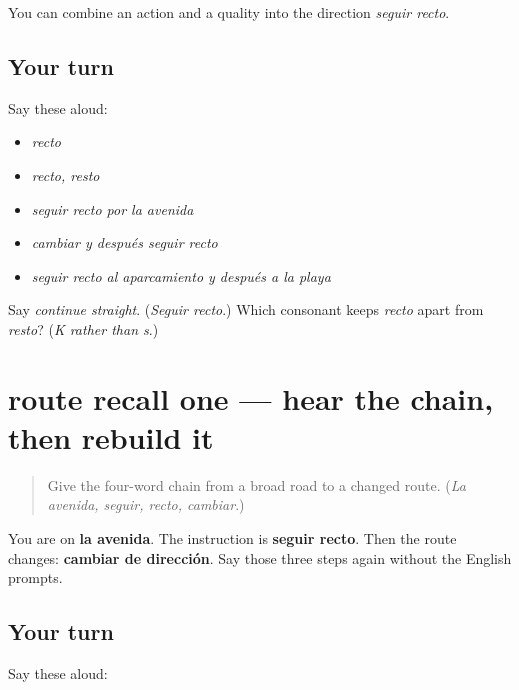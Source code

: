 \begin{grammarlens}[title={What you've built}]
You can combine an action and a quality into the direction \emph{seguir recto}.
\end{grammarlens}

\subsection*{Your turn}
Say these aloud:

\begin{itemize}
\raggedright
  \item \emph{recto}
  \item \emph{recto, resto}
  \item \emph{seguir recto por la avenida}
  \item \emph{cambiar y después seguir recto}
  \item \emph{seguir recto al aparcamiento y después a la playa}
\end{itemize}

\begin{tcolorbox}[breakable,colback=teal!4,colframe=teal!35!black,title={Before you move on}]
Say \emph{continue straight}. (\emph{Seguir recto}.) Which consonant keeps \emph{recto} apart from \emph{resto}? (\emph{K rather than s}.)
\end{tcolorbox}
\section[(review)]{route recall one — hear the chain, then rebuild it}

\label{lesson:ES-C401-route-recall-1}



\begin{quote}
Give the four-word chain from a broad road to a changed route. (\emph{La avenida, seguir, recto, cambiar}.)
\end{quote}

\begin{grammarlens}[title={What you've built}]
You are on \textbf{la avenida}. The instruction is \textbf{seguir recto}. Then the route changes: \textbf{cambiar de dirección}. Say those three steps again without the English prompts.
\end{grammarlens}

\subsection*{Your turn}
Say these aloud:

